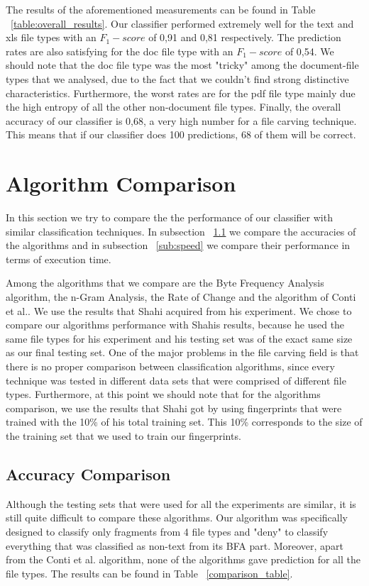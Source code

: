 The results of the aforementioned measurements can be found in Table ~\ref{table:overall_results}. Our classifier performed extremely well for the text and xls file types with an ${F_1}-score$ of 0,91 and 0,81 respectively. The prediction rates are also satisfying for the doc file type with an ${F_1}-score$  of 0,54. We should note that the doc file type was the most "tricky" among the document-file types that we analysed, due to the fact that we couldn't find strong distinctive characteristics. Furthermore, the worst rates are for the pdf file type mainly due the high entropy of all the other non-document file types. Finally, the overall accuracy of our classifier is 0,68, a very high number for a file carving technique. This means that if our classifier does 100 predictions, 68 of them will be correct.


\section{Algorithm Comparison}
In this section we try to compare the the performance of our classifier with similar classification techniques. In subsection ~\ref{sub:accuracy} we compare the accuracies of the algorithms and in subsection ~\ref{sub:speed} we compare their performance in terms of execution time.

Among the algorithms that we compare are the Byte Frequency Analysis algorithm\cite{MacDaniel}, the n-Gram Analysis\cite{ngram}, the Rate of Change\cite{roc} and the algorithm of Conti et al.\cite{Conti}. We use the results that Shahi acquired from his experiment\cite{Ashim}. We chose to compare our algorithms performance with Shahis results, because he used the same file types for his experiment and his testing set was of the exact same size as our final testing set. One of the major problems in the file carving field is that there is no proper comparison between classification algorithms, since every technique was tested in different data sets that were comprised of different file types. Furthermore, at this point we should note that for the algorithms comparison, we use the results that Shahi got by using fingerprints that were trained with the 10\% of his total training set. This 10\% corresponds to the size of the training set that we used to train our fingerprints.
\pagebreak

\subsection{Accuracy Comparison}\label{sub:accuracy}
Although the testing sets that were used for all the experiments are similar, it is still quite difficult to compare these algorithms. Our algorithm was specifically designed to classify only fragments from 4 file types and "deny" to classify everything that was classified as non-text from its BFA part. Moreover, apart from the Conti et al. algorithm, none of the algorithms gave prediction for all the file types. The results can be found in Table ~\ref{comparison_table}.
 

